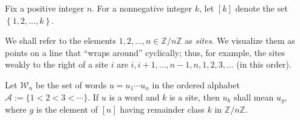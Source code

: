 \documentclass[reqno]{amsart}
\newcommand{\0}{\phantom{c}}
\newcommand{\merge}[1]{\vee_{#1}} %
\newcommand{\SymGp}[1]{\mathfrak{S}_{#1}} %
\newcommand{\xx}{\mathbf{x}}
\newcommand{\mm}{\mathbf{m}}
\newcommand{\mcA}{\mathcal{A}}
\newcommand{\mcW}{\mathcal{W}}
\newcommand{\ZZ}{\mathbb{Z}}
\newcommand{\set}[1]{\left\{ #1 \right\}}
\newcommand{\ive}[1]{\left[ #1 \right]}
\newcommand{\defn}[1]{{\color{darkred}\emph{#1}}} %
\theoremstyle{plain}
\theoremstyle{definition}
\numberwithin{equation}{section}
\begin{document}

Fix a positive integer $n$.
For a nonnegative integer $k$, let $\ive{k}$ denote the set $\set{1, 2, \ldots, k}$.

We shall refer to the elements $1, 2, \ldots, n \in \ZZ / n \ZZ$ as \defn{sites}.
We visualize them as points on a line that ``wraps around'' cyclically; thus, for example, the sites weakly to the right of a site $i$ are $i, i+1, \ldots, n-1, n, 1, 2, 3, \ldots$ (in this order).


Let $\mcW_n$ be the set of words $u = u_1 \dotsm u_n$ in the ordered alphabet $\mcA := \{1 < 2 < 3 < \cdots \}$.
If $u$ is a word and $k$ is a site, then $u_k$ shall mean $u_g$, where $g$ is the element of $\ive{n}$ having remainder class $k$ in $\ZZ / n \ZZ$.


\end{document}
